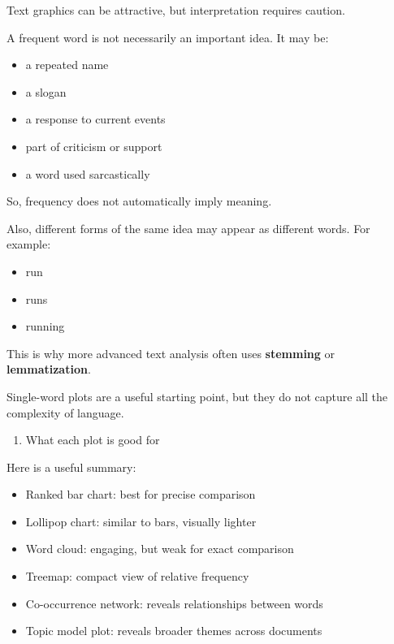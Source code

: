 \documentclass[
]{article}
\providecommand{\tightlist}{%
  \setlength{\itemsep}{0pt}\setlength{\parskip}{0pt}}
\begin{document}
Text graphics can be attractive, but interpretation requires caution.

A frequent word is not necessarily an important idea. It may be:

\begin{itemize}
\tightlist
\item
  a repeated name
\item
  a slogan
\item
  a response to current events
\item
  part of criticism or support
\item
  a word used sarcastically
\end{itemize}

So, frequency does not automatically imply meaning.

Also, different forms of the same idea may appear as different words.
For example:

\begin{itemize}
\tightlist
\item
  run
\item
  runs
\item
  running
\end{itemize}

This is why more advanced text analysis often uses \textbf{stemming} or
\textbf{lemmatization}.

Single-word plots are a useful starting point, but they do not capture
all the complexity of language.

\begin{enumerate}
\def\labelenumi{\arabic{enumi}.}
\setcounter{enumi}{14}
\tightlist
\item
  What each plot is good for
\end{enumerate}

Here is a useful summary:

\begin{itemize}
\tightlist
\item
  Ranked bar chart: best for precise comparison
\item
  Lollipop chart: similar to bars, visually lighter
\item
  Word cloud: engaging, but weak for exact comparison
\item
  Treemap: compact view of relative frequency
\item
  Co-occurrence network: reveals relationships between words
\item
  Topic model plot: reveals broader themes across documents
\end{itemize}
\end{document}
